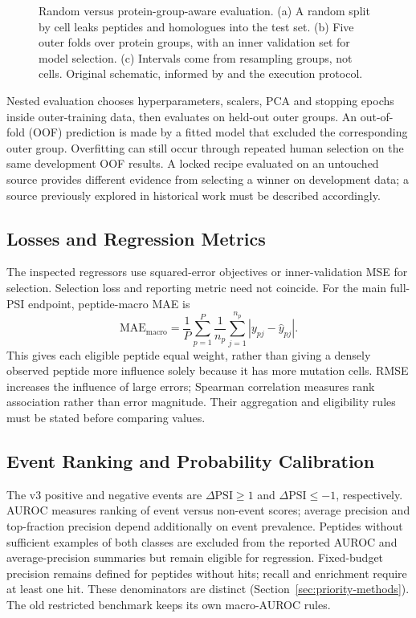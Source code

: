 \begin{figure}[htbp]
  \centering
  
  \caption[Random versus protein-group-aware evaluation]{Random versus protein-group-aware evaluation. (a) A random split by cell leaks peptides and homologues into the test set. (b) Five outer folds over protein groups, with an inner validation set for model selection. (c) Intervals come from resampling groups, not cells. Original schematic, informed by \citep{bernett2024,steinegger2017,efron1979} and the execution protocol.}
  \label{fig:group-split}
\end{figure}

Nested evaluation chooses hyperparameters, scalers, PCA and stopping epochs inside outer-training
data, then evaluates on held-out outer groups. An out-of-fold (OOF) prediction is made by a fitted
model that excluded the corresponding outer group. Overfitting can still occur through repeated
human selection on the same development OOF results. A locked recipe evaluated on an untouched
source provides different evidence from selecting a winner on development data; a source previously
explored in historical work must be described accordingly.

\subsection{Losses and Regression Metrics}
The inspected regressors use squared-error objectives or inner-validation MSE for selection. Selection
loss and reporting metric need not coincide. For the main full-PSI endpoint, peptide-macro MAE is
\begin{equation}
 \mathrm{MAE}_{\mathrm{macro}}=
 \frac{1}{P}\sum_{p=1}^{P}\frac{1}{n_p}\sum_{j=1}^{n_p}
       |y_{pj}-\widehat{y}_{pj}|.
 \label{eq:macro-mae}
\end{equation}
This gives each eligible peptide equal weight, rather than giving a densely observed peptide more
influence solely because it has more mutation cells. RMSE increases the influence of large errors;
Spearman correlation measures rank association rather than error magnitude. Their aggregation and
eligibility rules must be stated before comparing values.

\subsection{Event Ranking and Probability Calibration}
The v3 positive and negative events are $\Delta\mathrm{PSI}\geq1$ and
$\Delta\mathrm{PSI}\leq-1$, respectively. AUROC measures ranking of event versus non-event scores;
average precision and top-fraction precision depend additionally on event prevalence. Peptides
without sufficient examples of both classes are excluded from the reported AUROC and average-precision
summaries but remain eligible for regression. Fixed-budget precision remains defined for peptides
without hits; recall and enrichment require at least one hit. These denominators are distinct
(Section~\ref{sec:priority-methods}). The old restricted benchmark keeps its own macro-AUROC rules.

